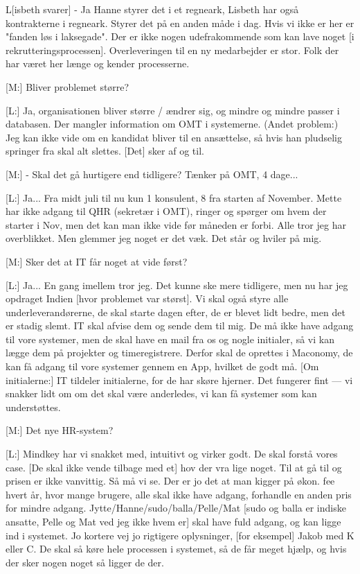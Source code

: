 L[isbeth svarer] - Ja
Hanne styrer det i et regneark, Lisbeth har også kontrakterne i regneark. Styrer det på en anden måde i dag. Hvis vi ikke er her er "fanden løs i laksegade". Der er ikke nogen udefrakommende som kan lave noget [i rekrutteringsprocessen]. Overleveringen til en ny medarbejder er stor. Folk der har været her længe og kender processerne.

[M:] Bliver problemet større?

[L:] Ja, organisationen bliver større / ændrer sig, og mindre og mindre passer i databasen. Der mangler information om OMT i systemerne. 
(Andet problem:)
Jeg kan ikke vide om en kandidat bliver til en ansættelse, så hvis han pludselig springer fra skal alt slettes. [Det] sker af og til.

[M:] - Skal det gå hurtigere end tidligere? Tænker på OMT, 4 dage...

[L:] Ja... Fra midt juli til nu kun 1 konsulent, 8 fra starten af November. Mette har ikke adgang til QHR (sekretær i OMT), ringer og spørger om hvem der starter i Nov, men det kan man ikke vide før måneden er forbi. Alle tror jeg har overblikket. Men glemmer jeg noget er det væk. Det står og hviler på mig.

[M:] Sker det at IT får noget at vide først?

[L:] Ja... En gang imellem tror jeg. Det kunne ske mere tidligere, men nu har jeg opdraget Indien [hvor problemet var størst]. Vi skal også styre alle underleverandørerne, de skal starte dagen efter, de er blevet lidt bedre, men det er stadig slemt. IT skal afvise dem og sende dem til mig. De må ikke have adgang til vore systemer, men de skal have en mail fra os og nogle initialer, så vi kan lægge dem på projekter og timeregistrere. Derfor skal de oprettes i Maconomy, de kan få adgang til vore systemer gennem en App, hvilket de godt må. [Om initialerne:] IT tildeler initialerne, for de har skøre hjerner. Det fungerer fint --- vi snakker lidt om om det skal være anderledes, vi kan få systemer som kan understøttes.

[M:] Det nye HR-system?

[L:] Mindkey har vi snakket med, intuitivt og virker godt. De skal forstå vores case. [De skal ikke vende tilbage med et] hov der vra lige noget. Til at gå til og prisen er ikke vanvittig. Så må vi se. Der er jo det at man kigger på økon. fee hvert år, hvor mange brugere, alle skal ikke have adgang, forhandle en anden pris for mindre adgang. Jytte/Hanne/sudo/balla/Pelle/Mat [sudo og balla er indiske ansatte, Pelle og Mat ved jeg ikke hvem er] skal have fuld adgang, og kan ligge ind i systemet. Jo kortere vej jo rigtigere oplysninger, [for eksempel] Jakob med K eller C. De skal så køre hele processen i systemet, så de får meget hjælp, og hvis der sker nogen noget så ligger de der.

